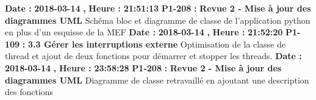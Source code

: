 \documentclass{article}%
\begin{document}
\newline%
%
\textbf{Date : }%
\textbf{2018{-}03{-}14}%
\textbf{,}%
\textbf{ Heure : }%
\textbf{21:51:13}%
\newline%
%
\textbf{P1{-}208 }%
\textbf{ : }%
\textbf{ Revue 2 {-} Mise à jour des diagrammes UML}%
\newline%
\newline%
%
Schéma bloc et diagramme de classe de l'application python en plus d'un esquisse de la MEF\newline%
\newline%
%
\textbf{Date : }%
\textbf{2018{-}03{-}14}%
\textbf{,}%
\textbf{ Heure : }%
\textbf{21:52:20}%
\newline%
%
\textbf{P1{-}109 }%
\textbf{ : }%
\textbf{ 3.3 Gérer les interruptions externe }%
\newline%
\newline%
%
Optimisation de la classe de thread et ajout de deux fonctions pour démarrer et stopper les threads.\newline%
\newline%
%
\textbf{Date : }%
\textbf{2018{-}03{-}14}%
\textbf{,}%
\textbf{ Heure : }%
\textbf{23:58:28}%
\newline%
%
\textbf{P1{-}208 }%
\textbf{ : }%
\textbf{ Revue 2 {-} Mise à jour des diagrammes UML}%
\newline%
\newline%
%
Diagramme de classe retravaillé en ajoutant une description des fonctions\newline%
\newline%
%
\newpage

%
\end{document}
